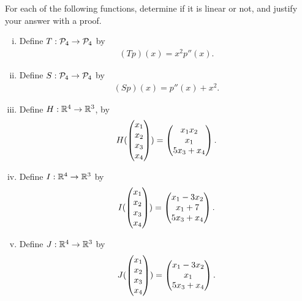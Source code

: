 \begin{question}
	\normalfont
	
	For each of the following functions, determine if it is linear or not, and justify your answer with a proof.
	
	
	\begin{enumerate}[(i)]
		\item Define $T:\P_4\to \P_4$ by 
		\begin{align*}
			(Tp)(x) =  x^2p''(x).
		\end{align*}

		\item Define $S:\P_4\to \P_4$ by 
		\begin{align*}
			(Sp)(x) =  p''(x) + x^2.
		\end{align*}
		
		\item Define $H:\real^4\to \real^3$,  by 
		\begin{align*}
			 H(\ColVecFour{x_1}{x_2}{x_3}{x_4})=  \ColVecThree{x_1x_2}{x_1}{5x_3 + x_4}.
		\end{align*}
		\vspace{.3cm}
		
		\item Define $I:\real^4\to \real^3$ by 
		\begin{align*}
			 I(\ColVecFour{x_1}{x_2}{x_3}{x_4})=  \ColVecThree{x_1-3x_2}{x_1+7}{5x_3 + x_4}.
		\end{align*}
			\vspace{.3cm}
			
		\item Define  $J:\real^4\to \real^3$ by 
		\begin{align*}
			 J(\ColVecFour{x_1}{x_2}{x_3}{x_4})=  \ColVecThree{x_1-3x_2}{x_1}{5x_3 + x_4}.
		\end{align*}
	\end{enumerate}
\end{question}

